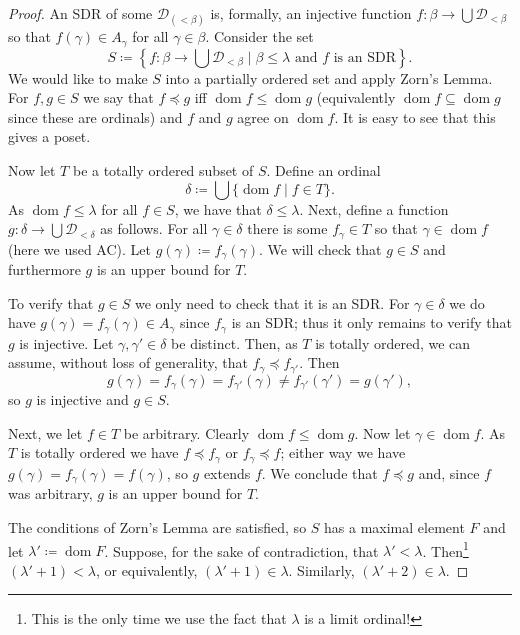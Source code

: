 \documentclass{article}
\DeclareMathOperator{\dom}{dom}
\theoremstyle{definition}
\theoremstyle{plain}
\theoremstyle{definition}
\begin{document}
\begin{proof}
 		An SDR of some $\mathcal{D}_{(< \beta)}$ is, formally, an injective function $f\colon \beta \to \bigcup \mathcal{D}_{< \beta}$ so that $f(\gamma) \in A_{\gamma}$ for all $\gamma \in \beta$. Consider the set 
 		\[
 			S \coloneqq \left\{f\colon \beta \to \bigcup \mathcal{D}_{< \beta} \mid \beta \leq \lambda \text{ and $f$ is an SDR}\right\}.
 		\]
 		We would like to make $S$ into a partially ordered set and apply Zorn's Lemma. For $f,g \in S$ we say that $f\preccurlyeq g$ iff $\dom f \leq \dom g$ (equivalently $\dom f \subseteq \dom g$ since these are ordinals) and $f$ and $g$ agree on $\dom f$. It is easy to see that this gives a poset. 
 		
 		Now let $T$ be a totally ordered subset of $S$. Define an ordinal
 		\[
 			\delta \coloneqq \bigcup\{\dom f \mid f\in T\}.
 		\]
 		As $\dom f \leq \lambda$ for all $f\in S$, we have that $\delta \leq \lambda$. Next, define a function $g\colon \delta \to \bigcup \mathcal{D}_{<\delta}$ as follows. For all $\gamma\in \delta$ there is some $f_{\gamma}\in T$ so that $\gamma \in \dom f$ (here we used AC). Let $g(\gamma) \coloneqq f_{\gamma}(\gamma)$. We will check that $g\in S$ and furthermore $g$ is an upper bound for $T$.
 		
 		To verify that $g\in S$ we only need to check that it is an SDR. For $\gamma \in \delta$ we do have $g(\gamma) = f_{\gamma}(\gamma) \in A_{\gamma}$ since $f_{\gamma}$ is an SDR; thus it only remains to verify that $g$ is injective. Let $\gamma,\gamma' \in \delta$ be distinct. Then, as $T$ is totally ordered, we can assume, without loss of generality, that $f_{\gamma} \preccurlyeq f_{\gamma'}$. Then
 		\[
 			g(\gamma) = f_{\gamma}(\gamma) = f_{\gamma'}(\gamma) \neq f_{\gamma'}(\gamma') = g(\gamma'),
 		\]
 		so $g$ is injective and $g\in S$. 
 		
 		Next, we let $f\in T$ be arbitrary. Clearly $\dom f \leq \dom g$. Now let $\gamma \in \dom f$. As $T$ is totally ordered we have $f\preccurlyeq f_{\gamma}$ or $f_{\gamma} \preccurlyeq f$; either way we have $g(\gamma) = f_{\gamma}(\gamma) = f(\gamma)$, so $g$ extends $f$. We conclude that $f\preccurlyeq g$ and, since $f$ was arbitrary, $g$ is an upper bound for $T$. 
 		
 		The conditions of Zorn's Lemma are satisfied, so $S$ has a maximal element $F$ and let $\lambda' \coloneqq \dom F$. Suppose, for the sake of contradiction, that $\lambda' < \lambda$. Then\footnote{This is the only time we use the fact that $\lambda$ is a limit ordinal!} $(\lambda' + 1) < \lambda$, or equivalently, $(\lambda' + 1) \in \lambda$. Similarly, $(\lambda' + 2) \in \lambda$.
 	\end{proof}
\end{document}
